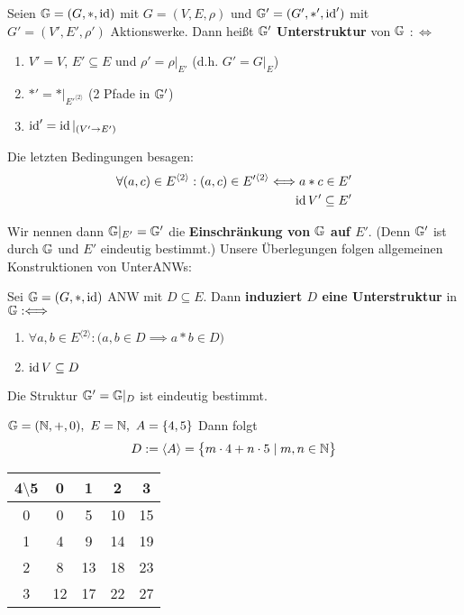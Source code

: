 \begin{definition}\enter
    Seien $\mathbb{G}=(G,\ast,\operatorname{id})$ mit $G=(V,E,\rho)$ und $\mathbb{G}'=(G',\ast',\operatorname{id}')$ mit $G'=(V',E',\rho')$ Aktionswerke. Dann heißt $\mathbb{G}'$ \textbf{Unterstruktur} von $\mathbb{G}$ $:\Longleftrightarrow$
    \begin{enumerate}
        \item $V'=V$, $E'\subseteq E$ und $\rho'=\rho|_{E'}$ (d.h. $G'=G|_E$)
        \item $\ast'=\ast|_{E'^{\langle 2\rangle}}$ (2 Pfade in $\mathbb{G}'$)
        \item $\operatorname{id}'=\operatorname{id}|_{(V'\to E')}$
    \end{enumerate}
    Die letzten Bedingungen besagen:
    \begin{align*}
        \forall (a,c)\in E^{\langle2\rangle}:(a,c)\in E'^{\langle2\rangle}\Longleftrightarrow a\ast c\in E'\\
        \operatorname{id} V'\subseteq E'
    \end{align*}
\end{definition}

Wir nennen dann $\mathbb{G}|_{E'}=\mathbb{G}'$ die \textbf{Einschränkung von $\mathbb{G}$ auf $E'$}. (Denn $\mathbb{G}'$ ist durch $\mathbb{G}$ und $E'$ eindeutig bestimmt.)\nl
Unsere Überlegungen folgen allgemeinen Konstruktionen von UnterANWs:

\begin{definition}
    Sei $\mathbb{G}=(G,\ast,\operatorname{id})$ ANW mit $D\subseteq E$. Dann \textbf{induziert $D$ eine Unterstruktur} in $\mathbb{G}:\Longleftrightarrow$
    \begin{enumerate}
        \item $\forall a,b\in E^{\langle2\rangle}:\big(a,b\in D\implies a\ast b\in D\big)$
        \item $\operatorname{id} V\subseteq D$
    \end{enumerate}
    Die Struktur $\mathbb{G}'=\mathbb{G}|_D$ ist eindeutig bestimmt.
\end{definition}

\begin{beispiel}
    $\mathbb{G}=(\mathbb{N},+,0),~E=\mathbb{N},~A=\lbrace 4,5\rbrace$ Dann folgt
    \begin{align*}
        D:=\langle A\rangle=\big\lbrace m\cdot 4+n\cdot 5\mid m,n\in\mathbb{N}\big\rbrace
    \end{align*}
    \begin{tabular}{c|cccc}
        4$\setminus$5 & 0 & 1 & 2 & 3\\ \hline
        0 & 0 & 5 & 10 & 15\\
        1 & 4 & 9 & 14 & 19\\
        2 & 8 & 13 & 18 & 23\\
        3 & 12 & 17 & 22 & 27
    \end{tabular}
\end{beispiel}

